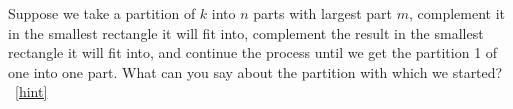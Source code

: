 \documentclass{book}
\begin{document}
\setcounter{project}{309}
\addtocounter{project}{-1}
\begin{activity}[]\label{activity-302}
\hypertarget{p-1572}{}%
Suppose we take a partition of \(k\) into \(n\) parts with largest part \(m\), complement it in the smallest rectangle it will fit into, complement the result in the smallest rectangle it will fit into, and continue the process until we get the partition 1 of one into one part.  What can you say about the partition with which we started?%
~\hfill{\tiny\hyperlink{a-309}{[hint]}\hypertarget{q-309}{}}\end{activity}
\end{document}
